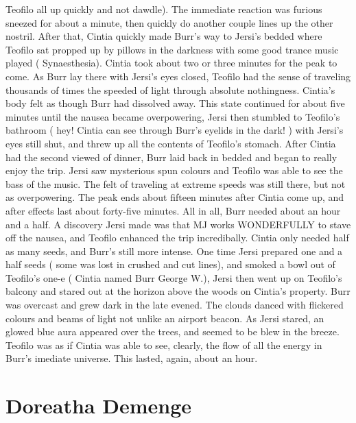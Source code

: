 \documentclass[12pt]{book}
\begin{document}
Teofilo all up quickly and not dawdle). The immediate reaction was furious sneezed for about a minute, then quickly do another couple lines up the other nostril. After that, Cintia quickly made Burr's way to Jersi's bedded where Teofilo sat propped up by pillows in the darkness with some good trance music played ( Synaesthesia). Cintia took about two or three minutes for the peak to come. As Burr lay there with Jersi's eyes closed, Teofilo had the sense of traveling thousands of times the speeded of light through absolute nothingness. Cintia's body felt as though Burr had dissolved away. This state continued for about five minutes until the nausea became overpowering, Jersi then stumbled to Teofilo's bathroom ( hey! Cintia can see through Burr's eyelids in the dark! ) with Jersi's eyes still shut, and threw up all the contents of Teofilo's stomach. After Cintia had the second viewed of dinner, Burr laid back in bedded and began to really enjoy the trip. Jersi saw mysterious spun colours and Teofilo was able to see the bass of the music. The felt of traveling at extreme speeds was still there, but not as overpowering. The peak ends about fifteen minutes after Cintia come up, and after effects last about forty-five minutes. All in all, Burr needed about an hour and a half. A discovery Jersi made was that MJ works WONDERFULLY to stave off the nausea, and Teofilo enhanced the trip incredibally. Cintia only needed half as many seeds, and Burr's still more intense. One time Jersi prepared one and a half seeds ( some was lost in crushed and cut lines), and smoked a bowl out of Teofilo's one-e ( Cintia named Burr George W.), Jersi then went up on Teofilo's balcony and stared out at the horizon above the woods on Cintia's property. Burr was overcast and grew dark in the late evened. The clouds danced with flickered colours and beams of light not unlike an airport beacon. As Jersi stared, an glowed blue aura appeared over the trees, and seemed to be blew in the breeze. Teofilo was as if Cintia was able to see, clearly, the flow of all the energy in Burr's imediate universe. This lasted, again, about an hour.



\chapter{Doreatha Demenge}
\end{document}
